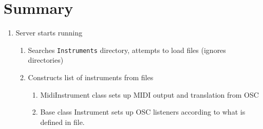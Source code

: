 \documentclass[11pt]{article}
\begin{document}
\section*{Summary}
\begin{enumerate}[\bf1.]
	\item Server starts running
	\begin{enumerate} [\bf a.]
		\item Searches \texttt{Instruments} directory, attempts to load files (ignores directories)
		\item Constructs list of instruments from files
		\begin{enumerate}
			\item MidiInstrument class sets up MIDI output and translation from OSC
			\item Base class Instrument sets up OSC listeners according to what is defined in file.
		\end{enumerate}
	 \end{enumerate}
\end{enumerate}
\end{document}
